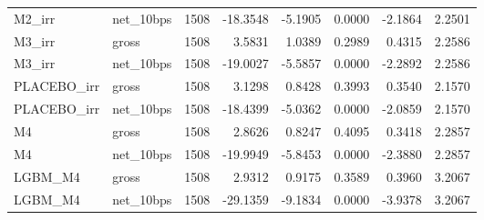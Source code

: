 \begin{tabular}{llrrrrrr}
M2\_irr & net\_10bps & 1508 & -18.3548 & -5.1905 & 0.0000 & -2.1864 & 2.2501 \\
M3\_irr & gross & 1508 & 3.5831 & 1.0389 & 0.2989 & 0.4315 & 2.2586 \\
M3\_irr & net\_10bps & 1508 & -19.0027 & -5.5857 & 0.0000 & -2.2892 & 2.2586 \\
PLACEBO\_irr & gross & 1508 & 3.1298 & 0.8428 & 0.3993 & 0.3540 & 2.1570 \\
PLACEBO\_irr & net\_10bps & 1508 & -18.4399 & -5.0362 & 0.0000 & -2.0859 & 2.1570 \\
M4 & gross & 1508 & 2.8626 & 0.8247 & 0.4095 & 0.3418 & 2.2857 \\
M4 & net\_10bps & 1508 & -19.9949 & -5.8453 & 0.0000 & -2.3880 & 2.2857 \\
LGBM\_M4 & gross & 1508 & 2.9312 & 0.9175 & 0.3589 & 0.3960 & 3.2067 \\
LGBM\_M4 & net\_10bps & 1508 & -29.1359 & -9.1834 & 0.0000 & -3.9378 & 3.2067 \\
\bottomrule
\end{tabular}
